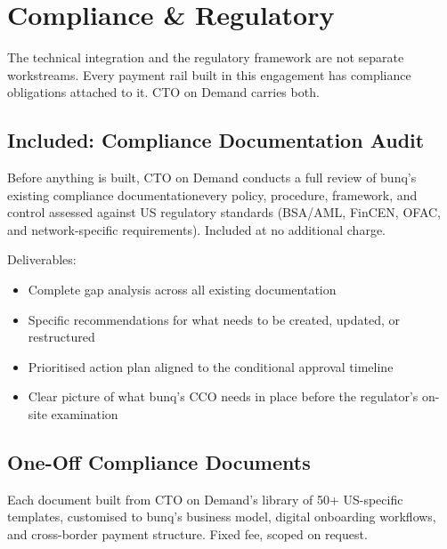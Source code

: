 
\section{Compliance \& Regulatory}

The technical integration and the regulatory framework are not separate workstreams. Every payment rail built in this engagement has compliance obligations attached to it. CTO on Demand carries both.

\subsection{Included: Compliance Documentation Audit}

Before anything is built, CTO on Demand conducts a full review of bunq's existing compliance documentation\dash every policy, procedure, framework, and control assessed against US regulatory standards (BSA/AML, FinCEN, OFAC, and network-specific requirements). Included at no additional charge.

Deliverables:
\begin{itemize}
\item Complete gap analysis across all existing documentation
\item Specific recommendations for what needs to be created, updated, or restructured
\item Prioritised action plan aligned to the conditional approval timeline
\item Clear picture of what bunq's CCO needs in place before the regulator's on-site examination
\end{itemize}

\subsection{One-Off Compliance Documents}

Each document built from CTO on Demand's library of 50+ US-specific templates, customised to bunq's business model, digital onboarding workflows, and cross-border payment structure. Fixed fee, scoped on request.

